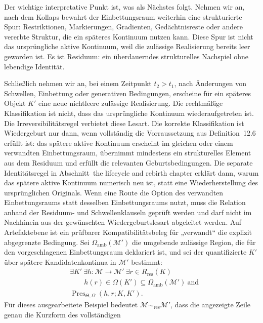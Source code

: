 Der wichtige interpretative Punkt ist, was als Nächstes folgt. Nehmen wir an, nach dem Kollaps bewahrt der Einbettungsraum weiterhin
eine strukturierte Spur: Restriktionen, Markierungen, Gradienten, Gedächtnisreste oder andere vererbte Struktur,
die ein späteres Kontinuum nutzen kann. Diese Spur ist nicht das ursprüngliche aktive Kontinuum, weil die
zulässige Realisierung bereits leer geworden ist. Es ist Residuum: ein überdauerndes strukturelles Nachspiel
ohne lebendige Identität.

Schließlich nehmen wir an, bei einem Zeitpunkt \(t_2>t_1\), nach Änderungen von Schwellen, Einbettung oder
generativen Bedingungen, erscheine für ein späteres Objekt \(K'\) eine neue nichtleere zulässige Realisierung.
Die rechtmäßige Klassifikation ist nicht, dass das ursprüngliche Kontinuum wiederaufgetreten ist. Die
Irreversibilitätsregel verbietet diese Lesart. Die korrekte Klassifikation ist Wiedergeburt nur dann, wenn
vollständig die Vorraussetzung aus Definition~12.6 erfüllt ist: das spätere aktive Kontinuum erscheint im
gleichen oder einem verwandten Einbettungsraum, übernimmt mindestens ein strukturelles Element aus dem
Residuum und erfüllt die relevanten Geburtsbedingungen. Die separate Identitätsregel in
Abschnitt~the lifecycle and rebirth chapter erklärt dann, warum das spätere aktive Kontinuum numerisch neu ist,
statt eine Wiederherstellung des ursprünglichen Originals.
Wenn eine Route die Option des verwandten Einbettungsraums statt desselben Einbettungsraums nutzt, muss die
Relation anhand der Residuum- und Schwellenklauseln geprüft werden und darf nicht im Nachhinein aus der
gewünschten Wiedergeburtslesart abgeleitet werden. Auf Artefaktebene ist ein prüfbarer Kompatibilitätsbeleg
für „verwandt“ die explizit abgegrenzte Bedingung. Sei \(\Omega_{\mathrm{amb}}(\mathcal{M}')\) die
umgebende zulässige Region, die für den vorgeschlagenen Einbettungsraum deklariert ist, und sei der
quantifizierte \(K'\) über spätere Kandidatenkontinua in \(\mathcal{M}'\) bestimmt:
\[
  \begin{aligned}
  &\exists K'\ \exists h:\mathcal{M}\to\mathcal{M}'\ \exists r\in R_{\mathrm{res}}(K)\\
  &\qquad h(r)\in\Omega(K')\subseteq\Omega_{\mathrm{amb}}(\mathcal{M}')\ \text{and}\\
  &\operatorname{Pres}_{\Theta,\Omega}(h,r;K,K').
  \end{aligned}
\]
Für dieses ausgearbeitete Beispiel bedeutet
\(\mathcal{M}\sim_{\mathrm{res}}\mathcal{M}'\), dass die angezeigte Zeile genau die Kurzform des vollständigen

